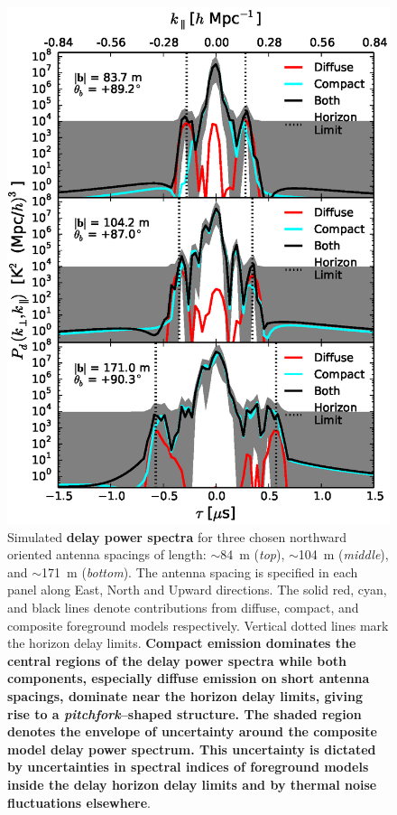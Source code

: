 \documentclass[preprint2,iop,numberedappendix]{emulateapj}
\begin{document}
\begin{figure}[htb]
\centering
\includegraphics[width=\linewidth]{fig11.eps}
\caption{Simulated {\bf delay power spectra} for three chosen northward oriented antenna spacings of length: $\sim$84~m ({\it top}), $\sim$104~m ({\it middle}), and $\sim$171~m ({\it bottom}). The antenna spacing is specified in each panel along East, North and Upward directions. The solid red, cyan, and black lines denote contributions from diffuse, compact, and composite foreground models respectively. Vertical dotted lines mark the horizon delay limits. {\bf Compact emission dominates the central regions of the delay power spectra while both components, especially diffuse emission on short antenna spacings, dominate near the horizon delay limits, giving rise to a {\it pitchfork}--shaped structure. The shaded region denotes the envelope of uncertainty around the composite model delay power spectrum. This uncertainty is dictated by uncertainties in spectral indices of foreground models inside the delay horizon delay limits and by thermal noise fluctuations elsewhere}. \label{fig:pitchfork-baselines}}
\end{figure}
\end{document}
